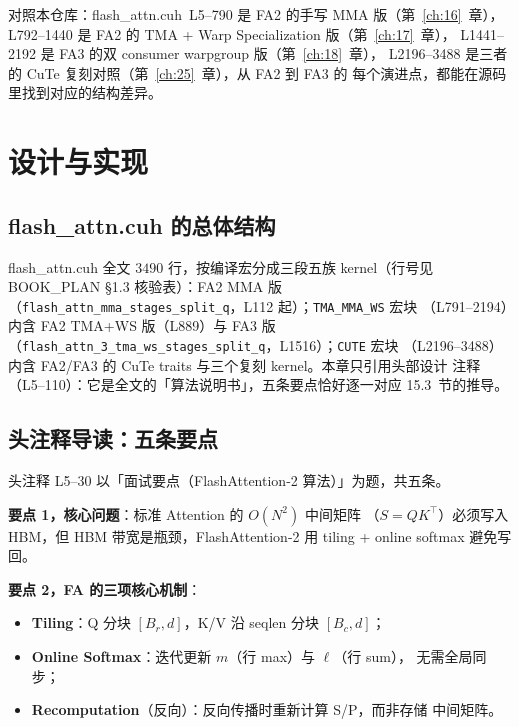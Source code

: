 对照本仓库：flash\_attn.cuh~L5--790 是 FA2 的手写 MMA 版（第~\ref{ch:16}~章），
L792--1440 是 FA2 的 TMA + Warp Specialization 版（第~\ref{ch:17}~章），
L1441--2192 是 FA3 的双 consumer warpgroup 版（第~\ref{ch:18}~章），
L2196--3488 是三者的 CuTe 复刻对照（第~\ref{ch:25}~章），从 FA2 到 FA3 的
每个演进点，都能在源码里找到对应的结构差异。

\section{设计与实现}

\subsection{flash\_attn.cuh 的总体结构}

flash\_attn.cuh 全文 $3490$ 行，按编译宏分成三段五族 kernel（行号见
BOOK\_PLAN \S 1.3 核验表）：FA2 MMA 版
（\texttt{flash\_\allowbreak{}attn\_\allowbreak{}mma\_\allowbreak{}stages\_\allowbreak{}split\_\allowbreak{}q}，L112 起）；\texttt{TMA\_MMA\_WS} 宏块
（L791--2194）内含 FA2 TMA+WS 版（L889）与 FA3 版
（\texttt{flash\_\allowbreak{}attn\_\allowbreak{}3\_\allowbreak{}tma\_\allowbreak{}ws\_\allowbreak{}stages\_\allowbreak{}split\_\allowbreak{}q}，L1516）；\texttt{CUTE} 宏块
（L2196--3488）内含 FA2/FA3 的 CuTe traits 与三个复刻 kernel。本章只引用头部设计
注释（L5--110）：它是全文的「算法说明书」，五条要点恰好逐一对应 15.3~节的推导。

\subsection{头注释导读：五条要点}

头注释 L5--30 以「面试要点（FlashAttention-2 算法）」为题，共五条。

\textbf{要点 1，核心问题}：标准 Attention 的 $O(N^{2})$ 中间矩阵
（$S = QK^{\top}$）必须写入 HBM，但 HBM 带宽是瓶颈，FlashAttention-2 用
tiling + online softmax 避免写回。

\textbf{要点 2，FA 的三项核心机制}：
\begin{itemize}
  \item \textbf{Tiling}：Q 分块 $[B_r, d]$，K/V 沿 seqlen 分块 $[B_c, d]$；
  \item \textbf{Online Softmax}：迭代更新 $m$（行 max）与 $\ell$（行 sum），
        无需全局同步；
  \item \textbf{Recomputation}（反向）：反向传播时重新计算 S/P，而非存储
        中间矩阵。
\end{itemize}

